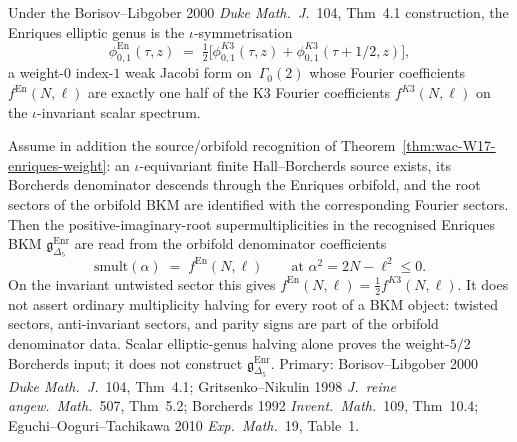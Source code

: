 \begin{theorem}
\label{thm:wac-W18-enriques-halving}
Under the Borisov--Libgober 2000 \emph{Duke Math.~J.}~104, Thm~4.1
construction, the Enriques elliptic genus is the
$\iota$-symmetrisation
\[
 \phi^{\mathrm{En}}_{0,1}(\tau, z)
 \;=\;
 \tfrac{1}{2}\bigl[\phi^{K3}_{0,1}(\tau,z)
 + \phi^{K3}_{0,1}(\tau + 1/2, z)\bigr],
\]
a weight-$0$ index-$1$ weak Jacobi form on~$\Gamma_0(2)$ whose
Fourier coefficients $f^{\mathrm{En}}(N,\ell)$ are exactly one
half of the K3 Fourier coefficients $f^{K3}(N,\ell)$ on the
$\iota$-invariant scalar spectrum.

Assume in addition the source/orbifold recognition of
Theorem~\ref{thm:wac-W17-enriques-weight}: an
$\iota$-equivariant finite Hall--Borcherds source exists, its
Borcherds denominator descends through the Enriques orbifold, and the
root sectors of the orbifold BKM are identified with the corresponding
Fourier sectors. Then the positive-imaginary-root
supermultiplicities in the recognised Enriques BKM
$\mathfrak{g}_{\Delta_5}^{\mathrm{Enr}}$ are read from the orbifold
denominator coefficients
\[
 \mathrm{smult}(\alpha)
 \;=\;
 f^{\mathrm{En}}(N,\ell)
 \qquad\text{at } \alpha^2 = 2N - \ell^2 \leq 0.
\]
On the invariant untwisted sector this gives
$f^{\mathrm{En}}(N,\ell)=\tfrac12 f^{K3}(N,\ell)$. It does not assert
ordinary multiplicity halving for every root of a BKM object: twisted
sectors, anti-invariant sectors, and parity signs are part of the
orbifold denominator data. Scalar elliptic-genus halving alone proves
the weight-$5/2$ Borcherds input; it does not construct
$\mathfrak{g}_{\Delta_5}^{\mathrm{Enr}}$.
Primary: Borisov--Libgober 2000 \emph{Duke Math.~J.}~104, Thm~4.1;
Gritsenko--Nikulin 1998 \emph{J.~reine angew.~Math.}~507, Thm~5.2;
Borcherds 1992 \emph{Invent.~Math.}~109, Thm~10.4;
Eguchi--Ooguri--Tachikawa 2010 \emph{Exp.~Math.}~19, Table~1.
\end{theorem}

